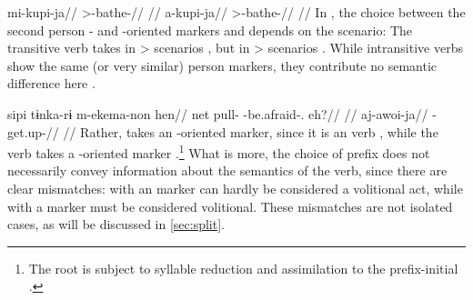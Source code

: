 \kalina
{}
\begingl
\gla mi-kupi-ja//
\glb {}>-bathe-//
\glft {} \parencite[][160]{hoff1968carib}//
\endgl
{}
\begingl
\gla a-kupi-ja//
\glb {}>-bathe-//
\glft {} \parencite[][63]{yamada2011evidentiality}//
\endgl
\xe
%
In , the choice between the second person - and -oriented markers  and  depends on the scenario:
The transitive verb   takes  in > scenarios , but  in > scenarios .
While intransitive verbs show the same (or very similar) person markers, they contribute no semantic difference here .

 \kalina
{}
\begingl
\gla sipi tɨnka-rɨ m-ekema-non hen//
\glb net pull- -be.afraid-. eh?//
\glft {} \parencite[][253]{courtz2008carib}//
\endgl
{}
\begingl
\gla aj-awoi-ja//
\glb {}-get.up-//
\glft {} \parencite[][167]{hoff1968carib}//
\endgl
\xe
%
Rather,   takes an -oriented marker, since it is an  verb , while the  verb   takes a -oriented marker .\footnote{The root   is subject to syllable reduction and assimilation to the prefix-initial .}
What is more, the choice of prefix does not necessarily convey information about the semantics of the verb, since there are clear mismatches:
 with an  marker can hardly be considered a volitional act, while   with a  marker must be considered volitional.
These mismatches are not isolated cases, as will be discussed in \cref{sec:split}.


